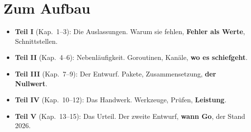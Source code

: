 \section*{Zum Aufbau}

\begin{itemize}
\item \textbf{Teil I} (Kap.\ 1--3): Die Auslassungen. Warum sie fehlen, \textbf{Fehler als Werte}, Schnittstellen.
\item \textbf{Teil II} (Kap.\ 4--6): Nebenläufigkeit. Goroutinen, Kanäle, \textbf{wo es schiefgeht}.
\item \textbf{Teil III} (Kap.\ 7--9): Der Entwurf. Pakete, Zusammensetzung, \textbf{der Nullwert}.
\item \textbf{Teil IV} (Kap.\ 10--12): Das Handwerk. Werkzeuge, Prüfen, \textbf{Leistung}.
\item \textbf{Teil V} (Kap.\ 13--15): Das Urteil. Der zweite Entwurf, \textbf{wann Go}, der Stand 2026.
\end{itemize}

